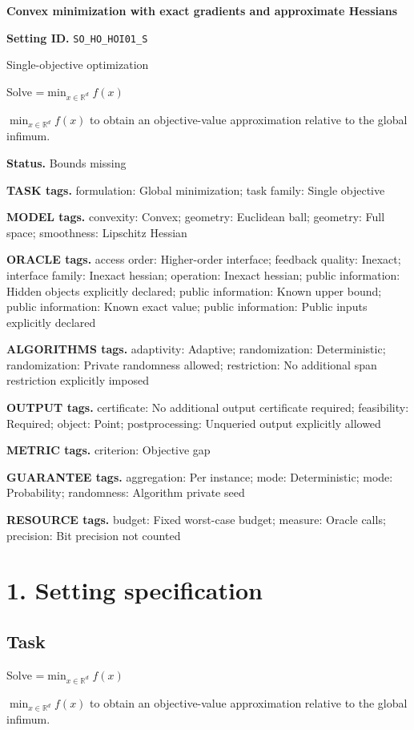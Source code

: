 \documentclass[10pt,a4paper]{article}
\newcommand{\AtlasMath}[1]{\par\begingroup\centering\setbox0=\hbox{$\displaystyle #1$}\ifdim\wd0>1.4\linewidth\typeout{ATLAS WIDE FORMULA: \the\wd0}\fi\ifdim\wd0>\linewidth\resizebox{\linewidth}{!}{\box0}\else\box0\fi\par\endgroup}
\newcommand{\AtlasInlineMath}[1]{\begingroup\setbox0=\hbox{$#1$}\ifdim\wd0>.4\linewidth\endgroup\AtlasMath{#1}\else\endgroup$#1$\fi}
\begin{document}
\raggedright

{\LARGE\bfseries\sffamily\color{AtlasNavy} Convex minimization with exact gradients and approximate Hessians\par}\vspace{5pt}
\textbf{Setting ID.} \texttt{SO\_\allowbreak{}HO\_\allowbreak{}HOI01\_\allowbreak{}S}

Single-objective optimization

Solve \AtlasInlineMath{\min_{x\in \mathbb{R}^d}f(x)} to obtain an objective-value approximation relative to the global infimum.

\textbf{Status.} Bounds missing

\textbf{TASK tags.} formulation: Global minimization; task family: Single objective

\textbf{MODEL tags.} convexity: Convex; geometry: Euclidean ball; geometry: Full space; smoothness: Lipschitz Hessian

\textbf{ORACLE tags.} access order: Higher-order interface; feedback quality: Inexact; interface family: Inexact hessian; operation: Inexact hessian; public information: Hidden objects explicitly declared; public information: Known upper bound; public information: Known exact value; public information: Public inputs explicitly declared

\textbf{ALGORITHMS tags.} adaptivity: Adaptive; randomization: Deterministic; randomization: Private randomness allowed; restriction: No additional span restriction explicitly imposed

\textbf{OUTPUT tags.} certificate: No additional output certificate required; feasibility: Required; object: Point; postprocessing: Unqueried output explicitly allowed

\textbf{METRIC tags.} criterion: Objective gap

\textbf{GUARANTEE tags.} aggregation: Per instance; mode: Deterministic; mode: Probability; randomness: Algorithm private seed

\textbf{RESOURCE tags.} budget: Fixed worst-case budget; measure: Oracle calls; precision: Bit precision not counted

\section{1. Setting specification}
\subsection{Task}
Solve \AtlasInlineMath{\min_{x\in \mathbb{R}^d}f(x)} to obtain an objective-value approximation relative to the global infimum.
\end{document}
